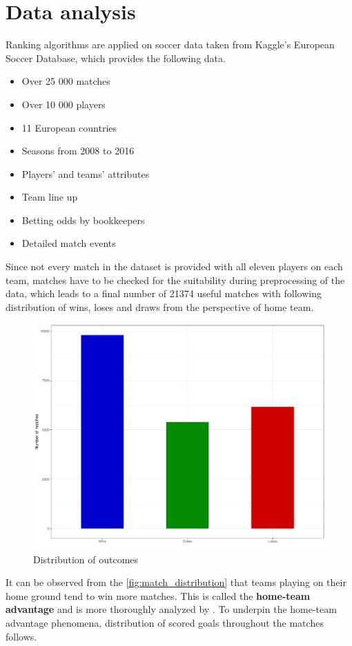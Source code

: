 \section{Data analysis}
\label{sec:data_analysis}
Ranking algorithms are applied on soccer data taken from Kaggle's European Soccer Database, which provides the following \citep{EuropeanSoccerDatabase} data.
\begin{itemize}
\item Over 25 000 matches
\item Over 10 000 players
\item 11 European countries
\item Seasons from 2008 to 2016
\item Players' and teams' attributes
\item Team line up
\item Betting odds by bookkeepers
\item Detailed match events
\end{itemize}

Since not every match in the dataset is provided with all eleven players on each team, matches have to be checked for the suitability during preprocessing of the data, which leads to a final number of 21374 useful matches with following distribution of wins, loses and draws from the perspective of home team.

\begin{figure}[H]
\centering
\includegraphics[width=.8\linewidth]{figs/match_distribution}
\caption{Distribution of outcomes}
\label{fig:match_distribution}
\end{figure}

It can be observed from the \autoref{fig:match_distribution} that teams playing on their home ground tend to win more matches. This is called the \textbf{home-team advantage} and is more thoroughly analyzed by \citet{BialkowskiWinHomeDraw}. To underpin the home-team advantage phenomena, distribution of scored goals throughout the matches follows.

